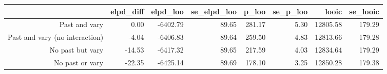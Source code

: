 \begin{table}[ht]
\centering
\begin{tabular}{rrrrrrrr}
  \hline
 & elpd\_diff & elpd\_loo & se\_elpd\_loo & p\_loo & se\_p\_loo & looic & se\_looic \\ 
  \hline
Past and vary & 0.00 & -6402.79 & 89.65 & 281.17 & 5.30 & 12805.58 & 179.29 \\ 
  Past and vary (no interaction) & -4.04 & -6406.83 & 89.64 & 259.50 & 4.83 & 12813.66 & 179.28 \\ 
  No past but vary & -14.53 & -6417.32 & 89.65 & 217.59 & 4.03 & 12834.64 & 179.29 \\ 
  No past or vary & -22.35 & -6425.14 & 89.69 & 178.10 & 3.25 & 12850.28 & 179.38 \\ 
   \hline
\end{tabular}
\end{table}
